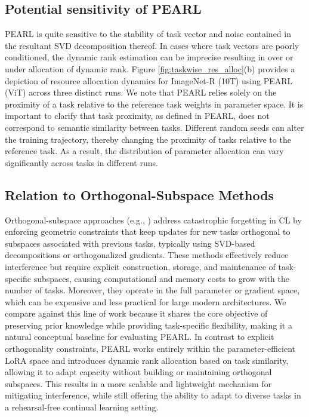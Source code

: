 \documentclass[10pt]{article} %
\begin{document}
\subsection{Potential sensitivity of PEARL}
PEARL is quite sensitive to the stability of task vector and noise contained in the resultant SVD decomposition thereof. In cases where task vectors are poorly conditioned, the dynamic rank estimation can be imprecise resulting in over or under allocation of dynamic rank. Figure \ref{fig:taskwise_res_alloc}(b) provides a depiction of resource allocation dynamics for ImageNet-R (10T) using PEARL (ViT) across three distinct runs. We note that PEARL relies solely on the proximity of a task relative to the reference task weights in parameter space. It is important to clarify that task proximity, as defined in PEARL, does not correspond to semantic similarity between tasks. Different random seeds can alter the training trajectory, thereby changing the proximity of tasks relative to the reference task. As a result, the distribution of parameter allocation can vary significantly across tasks in different runs.


\subsection{Relation to Orthogonal-Subspace Methods}

Orthogonal-subspace approaches (e.g., \cite{wang2023orthogonal,chaudhry2020continual}) address catastrophic forgetting in CL by enforcing geometric constraints that keep updates for new tasks orthogonal to subspaces associated with previous tasks, typically using SVD-based decompositions or orthogonalized gradients. These methods effectively reduce interference but require explicit construction, storage, and maintenance of task-specific subspaces, causing computational and memory costs to grow with the number of tasks. Moreover, they operate in the full parameter or gradient space, which can be expensive and less practical for large modern architectures. We compare against this line of work because it shares the core objective of preserving prior knowledge while providing task-specific flexibility, making it a natural conceptual baseline for evaluating PEARL. In contrast to explicit orthogonality constraints, PEARL works entirely within the parameter-efficient LoRA space and introduces dynamic rank allocation based on task similarity, allowing it to adapt capacity without building or maintaining orthogonal subspaces. This results in a more scalable and lightweight mechanism for mitigating interference, while still offering the ability to adapt to diverse tasks in a rehearsal-free continual learning setting.
\end{document}
